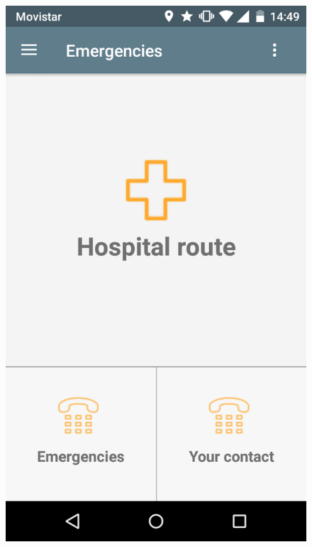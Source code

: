 \begin{itemize}
\begin{figure}[!h]
\centering
\includegraphics[scale=0.15]{Figures/emergencies.png}

\end{figure}
\end{itemize}
